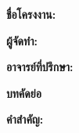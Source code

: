 \clearpage
\thispagestyle{plain}
\noindent\textbf{ชื่อโครงงาน:} \Field[9cm]{\ReportTitle}\par
\noindent\textbf{ผู้จัดทำ:} \Field[9cm]{\StudentName}\par
\noindent\textbf{อาจารย์ที่ปรึกษา:} \Field[8cm]{\AdvisorName}\par
\vspace{24pt}
\begin{center}
  \fontsize{18}{22}\selectfont\bfseries บทคัดย่อ
\end{center}
\BlankBody[9cm]
\noindent\textbf{คำสำคัญ:} \BlankField[9cm]
